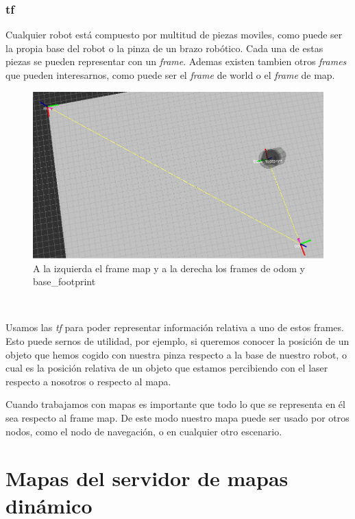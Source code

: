\subsubsection{tf}
\label{subsubsec:tf}
Cualquier robot está compuesto por multitud de piezas moviles, como puede ser la propia base del robot o la pinza de un brazo robótico. Cada una de estas piezas se pueden representar con un \textit{frame}. Ademas existen tambien otros \textit{frames} que pueden interesarnos, como puede ser el \textit{frame} de world o el \textit{frame} de map.\\
\begin{figure} [hbtp]
  \begin{center}
    \includegraphics[width=12cm]{img/cap4/frames}
  \end{center}
  \caption{A la izquierda el frame map y a la derecha los frames de odom y base\_footprint}
  \label{fig:frames}
\end{figure}\

Usamos las \textit{tf} para poder representar información relativa a uno de estos frames. Esto puede sernos de utilidad, por ejemplo, si queremos conocer la posición de un objeto que hemos cogido con nuestra pinza respecto a la base de nuestro robot, o cual es la posición relativa de un objeto que estamos percibiendo con el laser respecto a nosotros o respecto al mapa.

Cuando trabajamos con mapas es importante que todo lo que se representa en él sea respecto al frame map. De este modo nuestro mapa puede ser usado por otros nodos, como el nodo de navegación, o en cualquier otro escenario.

\section{Mapas del servidor de mapas dinámico}

